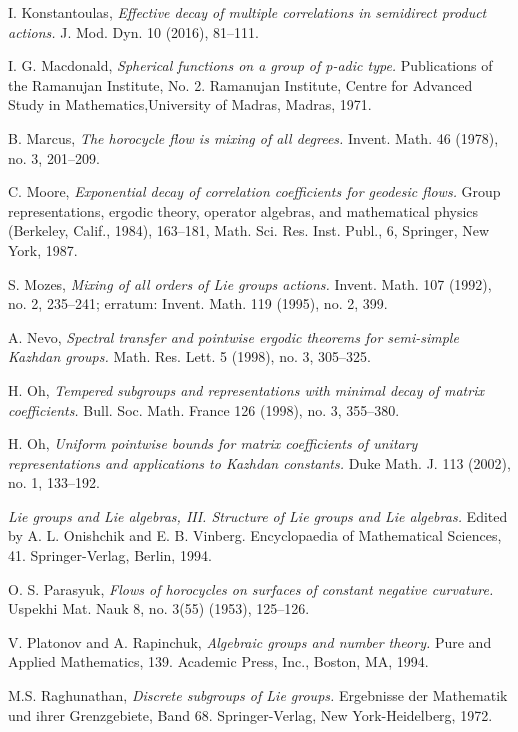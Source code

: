 \documentclass[11pt,reqno,a4paper]{amsart}
\numberwithin{equation}{section}
\theoremstyle{theorem}
\theoremstyle{definition}
\begin{document}
\begin{thebibliography}{99}
 I. Konstantoulas, \emph{Effective decay of multiple correlations in semidirect product actions.} J. Mod. Dyn. 10 (2016), 81--111.

 I. G. Macdonald, \emph{Spherical functions on a group of p-adic type.} Publications of the Ramanujan Institute, No. 2. Ramanujan Institute, Centre for Advanced Study in Mathematics,University of Madras, Madras, 1971.

  B. Marcus, \emph{The horocycle flow is mixing of all degrees.} Invent. Math. 46 (1978), no. 3, 201--209. 

 C. Moore,
\emph{Exponential decay of correlation coefficients for geodesic flows.} Group representations, ergodic theory, operator algebras, and mathematical physics (Berkeley, Calif., 1984), 163--181, 
Math. Sci. Res. Inst. Publ., 6, Springer, New York, 1987.

S. Mozes, \emph{Mixing of all orders of Lie groups actions.} Invent. Math. 107 (1992), no. 2, 235--241; erratum: Invent. Math. 119 (1995), no. 2, 399.

 A. Nevo,
\emph{Spectral transfer and pointwise ergodic theorems for semi-simple Kazhdan groups. }
Math. Res. Lett. 5 (1998), no. 3, 305--325.

 H. Oh, \emph{Tempered subgroups and representations with minimal decay of matrix coefficients.} Bull. Soc. Math. France 126 (1998), no. 3, 355--380.

 H. Oh, \emph{Uniform pointwise bounds for matrix coefficients of unitary representations and applications to Kazhdan constants.} Duke Math. J. 113 (2002), no. 1, 133--192.

 \emph{Lie groups and Lie algebras, III. Structure of Lie groups and Lie algebras.} Edited
by A. L. Onishchik and E. B. Vinberg. Encyclopaedia of Mathematical Sciences, 41.
Springer-Verlag, Berlin, 1994.

 O. S. Parasyuk, \emph{Flows of horocycles on surfaces of constant negative curvature.} Uspekhi Mat. Nauk 8, no. 3(55) (1953), 125--126.

V. Platonov and A. Rapinchuk, 
\emph{Algebraic groups and number theory.} Pure and Applied Mathematics, 139. Academic Press, Inc., Boston, MA, 1994. 

 M.S. Raghunathan, \emph{Discrete subgroups of Lie groups.} Ergebnisse der Mathematik und ihrer Grenzgebiete, Band 68. Springer-Verlag, New York-Heidelberg, 1972.


\end{thebibliography}
\end{document}
